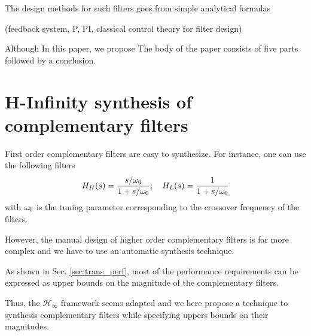 \documentclass[9pt, technote, a4paper]{ieeeconf}
\begin{document}
\cite{hua04_polyp_fir_compl_filter_contr_system}

\cite{collette15_sensor_fusion_method_high_perfor}
The design methods for such filters goes from simple analytical formulas

\cite{corke04_inert_visual_sensin_system_small_auton_helic}

\cite{min15_compl_filter_desig_angle_estim}
\cite{jensen13_basic_uas}

\cite{shaw90_bandw_enhan_posit_measur_using_measur_accel}
\cite{zimmermann92_high_bandw_orien_measur_contr}
\cite{matichard15_seism_isolat_advan_ligo}
\cite{collette15_sensor_fusion_method_high_perfor}

\cite{hua05_low_ligo}
\cite{hua04_polyp_fir_compl_filter_contr_system}
\cite{matichard15_seism_isolat_advan_ligo}

\cite{mahony08_nonlin_compl_filter_special_orthog_group}

\cite{pascoal99_navig_system_desig_using_time}

\cite{jensen13_basic_uas} (feedback system, P, PI, classical control theory for filter design)
\cite{brown72_integ_navig_system_kalman_filter}

\cite{pascoal99_navig_system_desig_using_time}

\cite{min15_compl_filter_desig_angle_estim}
Although
In this paper, we propose
The body of the paper consists of five parts followed by a conclusion.

\section{H-Infinity synthesis of complementary filters}
\label{sec:org303afb5}
  \label{sec:hinf_filters}
First order complementary filters are easy to synthesize. For instance, one can use the following filters
\begin{equation}
H_H(s) = \frac{s/\omega_0}{1 + s/\omega_0}; \quad H_L(s) = \frac{1}{1 + s/\omega_0}
\end{equation}
with \(\omega_0\) is the tuning parameter corresponding to the crossover frequency of the filters.

However, the manual design of higher order complementary filters is far more complex and we have to use an automatic synthesis technique.


As shown in Sec. \ref{sec:trans_perf}, most of the performance requirements can be expressed as upper bounds on the magnitude of the complementary filters.

Thus, the \(\mathcal{H}_\infty\) framework seems adapted and we here propose a technique to synthesis complementary filters while specifying uppers bounds on their magnitudes.
\end{document}
